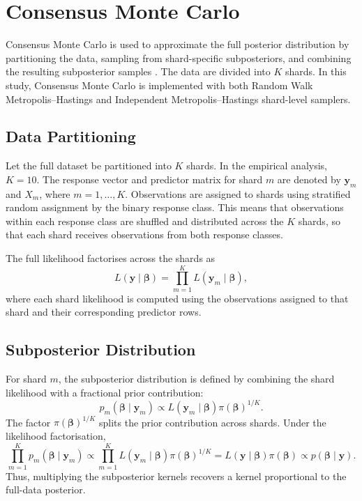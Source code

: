 \section{Consensus Monte Carlo}

Consensus Monte Carlo is used to approximate the full posterior distribution by partitioning the data, sampling from shard-specific subposteriors, and combining the resulting subposterior samples \cite{scott2016bayes,scott2017comparing}. The data are divided into $K$ shards. In this study, Consensus Monte Carlo is implemented with both Random Walk Metropolis--Hastings and Independent Metropolis--Hastings shard-level samplers.

\subsection{Data Partitioning}

Let the full dataset be partitioned into $K$ shards. In the empirical analysis, $K=10$. The response vector and predictor matrix for shard $m$ are denoted by $\mathbf{y}_m$ and $X_m$, where $m=1,\ldots,K$. Observations are assigned to shards using stratified random assignment by the binary response class. This means that observations within each response class are shuffled and distributed across the $K$ shards, so that each shard receives observations from both response classes.

The full likelihood factorises across the shards as
\[
L(\mathbf{y}\mid \boldsymbol{\beta})
=
\prod_{m=1}^{K}
L(\mathbf{y}_m\mid \boldsymbol{\beta}),
\]
where each shard likelihood is computed using the observations assigned to that shard and their corresponding predictor rows.

\subsection{Subposterior Distribution}

For shard $m$, the subposterior distribution is defined by combining the shard likelihood with a fractional prior contribution:
\[
p_m(\boldsymbol{\beta}\mid \mathbf{y}_m)
\propto
L(\mathbf{y}_m\mid \boldsymbol{\beta})
\pi(\boldsymbol{\beta})^{1/K}.
\]
The factor $\pi(\boldsymbol{\beta})^{1/K}$ splits the prior contribution across shards. Under the likelihood factorisation,
\[
\prod_{m=1}^{K}
p_m(\boldsymbol{\beta}\mid \mathbf{y}_m)
\propto
\prod_{m=1}^{K}
L(\mathbf{y}_m\mid \boldsymbol{\beta})
\pi(\boldsymbol{\beta})^{1/K}
=
L(\mathbf{y}\mid \boldsymbol{\beta})\pi(\boldsymbol{\beta})
\propto
p(\boldsymbol{\beta}\mid \mathbf{y}).
\]
Thus, multiplying the subposterior kernels recovers a kernel proportional to the full-data posterior.

